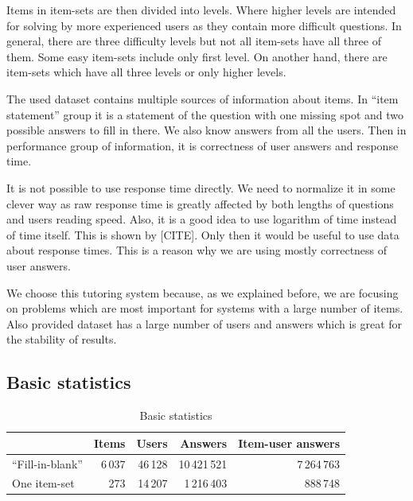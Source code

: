 \documentclass[
  digital, %
  table,   %
  nolof,     %
  nolot,     %
  nocover
]{fithesis3}
\begin{document}
Items in item-sets are then divided into levels. Where higher levels are intended for solving by more experienced users as they contain more difficult questions. In general, there are three difficulty levels but not all item-sets have all three of them. Some easy item-sets include only first level. On another hand, there are item-sets which have all three levels or only higher levels.


The used dataset contains multiple sources of information about items. In ``item statement'' group it is a statement of the question with one missing spot and two possible answers to fill in there. We also know answers from all the users. Then in performance group of information, it is correctness of user answers and response time.

It is not possible to use response time directly. We need to normalize it in some clever way as raw response time is greatly affected by both lengths of questions and users reading speed. Also, it is a good idea to use logarithm of time instead of time itself. This is shown by [CITE]. Only then it would be useful to use data about response times. This is a reason why we are using mostly correctness of user answers.


We choose this tutoring system because, as we explained before, we are focusing on problems which are most important for systems with a large number of items. Also provided dataset has a large number of users and answers which is great for the stability of results.


\subsection{Basic statistics}\label{basic-statistics}

\begin{table}
  \begin{tabular}{|l|r r r r|}
    \hline
     & Items & Users & Answers & Item-user answers \\
    \hline\hline
    ``Fill-in-blank'' & 6\,037 & 46\,128 & 10\,421\,521 & 7\,264\,763 \\
    \hline
    One item-set & 273 & 14\,207 & 1\,216\,403 & 888\,748 \\
    \hline
  \end{tabular}
  \caption{Basic statistics}
  \label{tab:basic-statistics}
\end{table}
\end{document}
